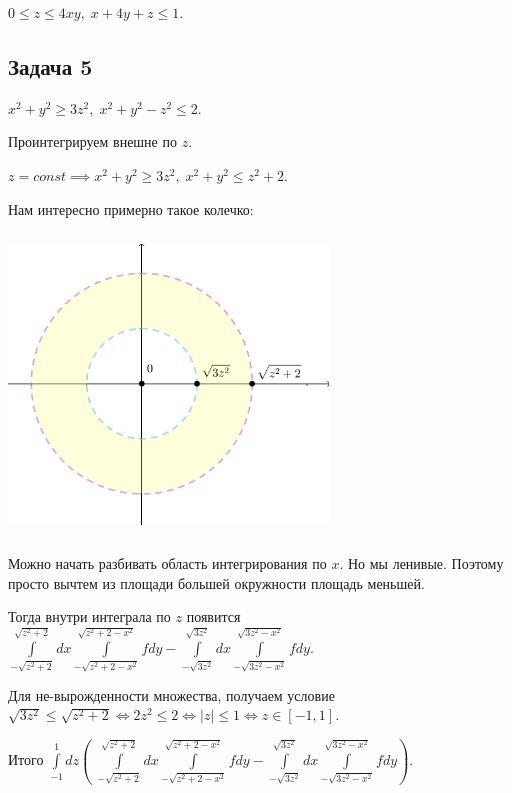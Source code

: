 \documentclass[a4paper, fleqn]{article}
\begin{document}
    $0 \leq z \leq 4xy, \; x + 4y + z \leq 1. $
    
    
    
    \subsection*{Задача 5}
    
    $x^2 + y^2 \geq 3 z^2, \; x^2 + y^2 - z^2 \leq 2. $
    
    Проинтегрируем внешне по $z$. 
    
    $z = const \implies x^2 + y^2 \geq 3z^2, \; x^2 + y^2 \leq z^2 + 2.$
    
    Нам интересно примерно такое колечко:
    
    
   \includegraphics[width=8.5cm, height=8cm]{list24imgs/task 2.4.3.png}
    
    Можно начать разбивать область интегрирования по $x$. Но мы ленивые. Поэтому просто вычтем из площади большей окружности площадь меньшей.
    
    Тогда внутри интеграла по $z$ появится $\displaystyle \int \limits_{-\sqrt{z^2 + 2}}^{\sqrt{z^2 + 2}} dx \int \limits_{-\sqrt{z^2 + 2 - x^2}}^{\sqrt{z^2 + 2 - x^2}} f dy - \int \limits_{-\sqrt{3z^2}}^{\sqrt{3z^2}} dx \int \limits_{-\sqrt{3z^2- x^2}}^{\sqrt{3z^2 - x^2}} f dy  .$
    
    
    Для не-вырожденности множества, получаем условие $\sqrt{3z^2} \leq \sqrt{z^2 + 2} \iff 2z^2 \leq 2 \iff |z| \leq 1 \iff z \in [-1, 1].$
    
    
    Итого $\displaystyle \int \limits_{-1}^{1} dz \left( \; \int \limits_{-\sqrt{z^2 + 2}}^{\sqrt{z^2 + 2}} dx \int \limits_{-\sqrt{z^2 + 2 - x^2}}^{\sqrt{z^2 + 2 - x^2}} f dy - \int \limits_{-\sqrt{3z^2}}^{\sqrt{3z^2}} dx \int \limits_{-\sqrt{3z^2- x^2}}^{\sqrt{3z^2 - x^2}} f dy  \right).$
    
\end{document}
